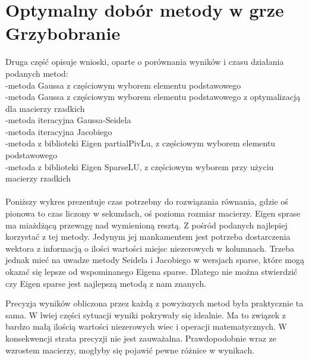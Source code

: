 \documentclass[8pt]{article}
\begin{document}
\section*{Optymalny dobór metody w grze Grzybobranie}
Druga część opisuje wnioski, oparte o porównania wyników i czasu działania podanych metod:\\
-metoda Gaussa z częściowym wyborem elementu podstawowego\\
-metoda Gaussa z częściowym wyborem elementu podstawowego z optymalizacją dla macierzy rzadkich\\
-metoda iteracyjna Gaussa-Seidela\\
-metoda iteracyjna Jacobiego\\
-metoda z biblioteki Eigen partialPivLu, z częściowym wyborem elementu podstawowego\\
-metoda z biblioteki Eigen SparseLU, z częściowym wyborem przy użyciu macierzy rzadkich\\
\\
Poniższy wykres prezentuje czas potrzebny do rozwiązania równania, gdzie  oś pionowa to czas liczony w sekundach, oś pozioma rozmiar macierzy. Eigen sprase ma miażdżącą przewagę nad  wymienioną resztą. Z pośród podanych najlepiej korzystać z tej metody. Jedynym jej mankamentem jest potrzeba dostarczenia wektora z informacją o ilości wartości miejsc niezerowych w kolumnach. Trzeba jednak mieć na uwadze metody Seidela i Jacobiego w wersjach sparse, które mogą okazać się lepsze od wspominanego Eigena sparse. Dlatego nie można stwierdzić czy Eigen sparse jest najlepszą metodą z nam znanych.
\begin{center}
\end{center}
Precyzja wyników obliczona przez każdą z powyższych metod była praktycznie ta sama. W lwiej części sytuacji wyniki pokrywały się idealnie. Ma to związek z bardzo małą ilością wartości niezerowych wiec i operacji matematycznych. W konsekwencji strata precyzji nie jest zauważalna. Prawdopodobnie wraz ze wzrostem macierzy, mogłyby się pojawić pewne różnice w wynikach.\\
\end{document}

